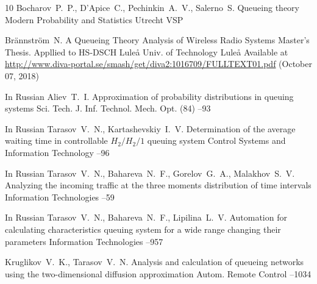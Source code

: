 \begin{thebibliography}{10}
\by Bocharov~P.~P., D'Apice~C., Pechinkin~A.~V., Salerno~S.
\book Queueing theory
\serial Modern Probability and Statistics
\publaddr Utrecht
\publ VSP 



\by Br\"annstr\"om~N.
\thesis A Queueing Theory Analysis of Wireless Radio Systems
\thesisinfo Master's  Thesis. Appllied to HS-DSCH
\publ Lule\r{a} Univ. of Technology
\publaddr Lule\r{a}
\elink
Available at  \url{http://www.diva-portal.se/smash/get/diva2:1016709/FULLTEXT01.pdf} (October 07, 2018)





\lang In Russian
\by Aliev~T.~I.
\paper Approximation of probability distributions in queuing systems
\jour Sci. Tech. J. Inf. Technol. Mech. Opt. 
(84)
--93


\lang In Russian
\by Tarasov~V.~N., Kartashevskiy~I.~V.
\paper Determination of the average waiting time in controllable $H_2/H_2/1$ queuing system 
\jour Control Systems and Information Technology
--96




\lang In Russian
\by Tarasov~V.~N., Bahareva~N.~F., Gorelov~G.~A., Malakhov~S.~V.
\paper Analyzing the incoming traffic at the three moments distribution of time intervals
\jour Information Technologies
--59

\lang In Russian
\by Tarasov~V.~N., Bahareva~N.~F., Lipilina~L.~V.
\paper Automation for calculating characteristics queuing system for a wide range changing their parameters
\jour Information Technologies
--957



\by Kruglikov~V.~K., Tarasov~V.~N.
\paper Analysis and calculation of queueing networks using the two-dimensional diffusion approximation
\jour Autom. Remote Control
--1034

\end{thebibliography}


%

